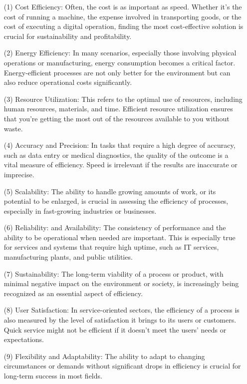\begin{enumerate}[leftmargin=2em]

\item[(1)] Cost Efficiency: Often, the cost is as important as speed. Whether it’s the cost of running a machine, the expense involved in transporting goods, or the cost of executing a digital operation, finding the most cost-effective solution is crucial for sustainability and profitability.

\item[(2)] Energy Efficiency: In many scenarios, especially those involving physical operations or manufacturing, energy consumption becomes a critical factor. Energy-efficient processes are not only better for the environment but can also reduce operational costs significantly.

\item[(3)] Resource Utilization: This refers to the optimal use of resources, including human resources, materials, and time. Efficient resource utilization ensures that you're getting the most out of the resources available to you without waste.

\item[(4)] Accuracy and Precision: In tasks that require a high degree of accuracy, such as data entry or medical diagnostics, the quality of the outcome is a vital measure of efficiency. Speed is irrelevant if the results are inaccurate or imprecise.

\item[(5)] Scalability: The ability to handle growing amounts of work, or its potential to be enlarged, is crucial in assessing the efficiency of processes, especially in fast-growing industries or businesses.

\item[(6)] Reliability: and Availability: The consistency of performance and the ability to be operational when needed are important. This is especially true for services and systems that require high uptime, such as IT services, manufacturing plants, and public utilities.

\item[(7)] Sustainability: The long-term viability of a process or product, with minimal negative impact on the environment or society, is increasingly being recognized as an essential aspect of efficiency.

\item[(8)] User Satisfaction: In service-oriented sectors, the efficiency of a process is also measured by the level of satisfaction it brings to its users or customers. Quick service might not be efficient if it doesn’t meet the users’ needs or expectations.

\item[(9)] Flexibility and Adaptability: The ability to adapt to changing circumstances or demands without significant drops in efficiency is crucial for long-term success in most fields.

\end{enumerate}

